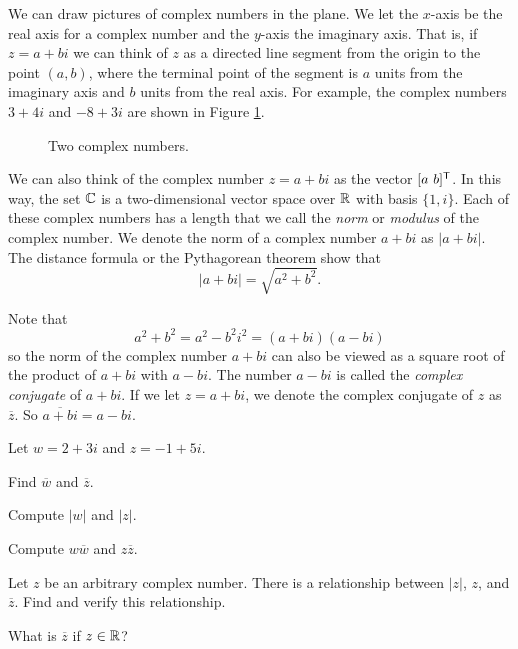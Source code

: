 
We can draw pictures of complex numbers in the plane. We let the $x$-axis be the real axis for a complex number and the $y$-axis the imaginary axis. That is, if $z=a+bi$ we can think of $z$ as a directed line segment from the origin to the point $(a,b)$, where the terminal point of the segment is $a$ units from the imaginary axis and $b$ units from the real axis. For example, the complex numbers $3+4i$ and $-8+3i$ are shown in Figure \ref{F:complex_numbers}.
 \begin{figure}
\begin{center}
\caption{\scriptsize Two complex numbers.}
\label{F:complex_numbers}
\end{center}
\end{figure}

We can also think of the complex number $z = a+bi$ as the vector $[a \ b]^{\mathsf{T}}$. In this way, the set $\mathbb{C}$ is a two-dimensional vector space over $\mathbb{R}$ with basis $\{1, i\}$. Each of these complex numbers has a length that we call the \emph{norm} or \emph{modulus} of the complex number. We denote the norm of a complex number $a+bi$ as $|a+bi|$. The distance formula or the Pythagorean theorem show that
\[|a+bi| = \sqrt{a^2+b^2}.\]

Note that
\[a^2+b^2 = a^2-b^2i^2 = (a+bi)(a-bi)\]
so the norm of the complex number $a+bi$ can also be viewed as a square root of the product of $a+bi$ with $a-bi$. The number $a-bi$ is called the \emph{complex conjugate} of $a+bi$. If we let $z = a+bi$, we denote the complex conjugate of $z$ as $\overline{z}$. So $\overline{a+bi} = a-bi$.


\begin{activity} Let $w = 2+3i$ and $z = -1+5i$.
\ba
\item Find $\overline{w}$ and $\overline{z}$.

\item Compute $|w|$ and $|z|$.

\item Compute $w\overline{w}$ and $z \overline{z}$.


\item Let $z$ be an arbitrary complex number. There is a relationship between $|z|$, $z$, and $\overline{z}$. Find and verify this relationship.

\item What is $\overline{z}$ if $z \in \mathbb{R}$?

\ea

\end{activity}

